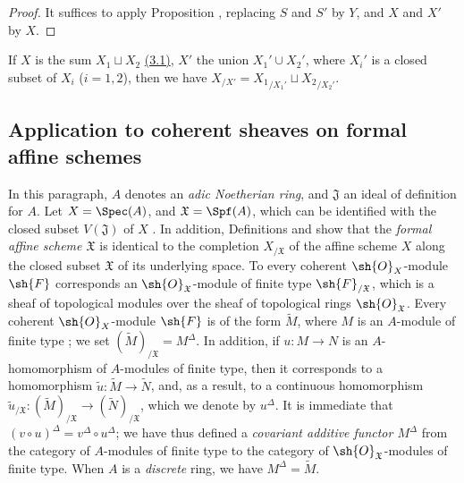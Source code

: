 \begin{proof}
It suffices to apply Proposition , replacing $S$ and $S'$ by $Y$, and $X$ and $X'$ by $X$.
\end{proof}

\begin{remark}[10.9.10]
\label{I.10.9.10}
If $X$ is the sum $X_1\sqcup X_2$ \hyperref[subsection:I.3.1]{(3.1)}, $X'$ the union $X_1'\cup X_2'$, where $X_i'$ is a closed subset of $X_i$ ($i=1,2$), then we have $X_{/X'}={X_1}_{/X_1'}\sqcup{X_2}_{/X_2'}$.
\end{remark}

\subsection{Application to coherent sheaves on formal affine schemes}
\label{subsection:I.10.10}

\begin{env}[10.10.1]
\label{I.10.10.1}
In this paragraph, $A$ denotes an \emph{adic Noetherian ring}, and $\mathfrak{J}$ an ideal of definition for $A$.
Let $X=\Spec(A)$, and $\mathfrak{X}=\Spf(A)$, which can be identified with the closed subset $V(\mathfrak{J})$ of $X$ .
In addition, Definitions  and  show that the \emph{formal affine scheme $\mathfrak{X}$} is identical to the completion $X_{/\mathfrak{X}}$ of the affine scheme $X$ along the closed subset $\mathfrak{X}$ of its underlying space.
To every coherent $\sh{O}_X$-module $\sh{F}$ corresponds an $\sh{O}_\mathfrak{X}$-module of finite type $\sh{F}_{/\mathfrak{X}}$, which is a sheaf of topological modules over the sheaf of topological rings $\sh{O}_\mathfrak{X}$.
Every coherent $\sh{O}_X$-module $\sh{F}$ is of the form $\widetilde{M}$, where $M$ is an $A$-module of finite type ; we set $(\widetilde{M})_{/\mathfrak{X}}=M^\Delta$.
In addition, if $u:M\to N$ is an $A$-homomorphism of $A$-modules of finite type, then it corresponds to a homomorphism $\widetilde{u}:\widetilde{M}\to\widetilde{N}$, and, as a result, to a continuous homomorphism $\widetilde{u}_{/\mathfrak{X}}:(\widetilde{M})_{/\mathfrak{X}}\to(\widetilde{N})_{/\mathfrak{X}}$, which we denote by $u^\Delta$.
It is immediate that $(v\circ u)^\Delta=v^\Delta\circ u^\Delta$; we have thus defined a \emph{covariant additive functor $M^\Delta$} from the category of $A$-modules of finite type to the category of $\sh{O}_\mathfrak{X}$-modules of finite type.
When $A$ is a \emph{discrete} ring, we have $M^\Delta=\widetilde{M}$.
\end{env}

